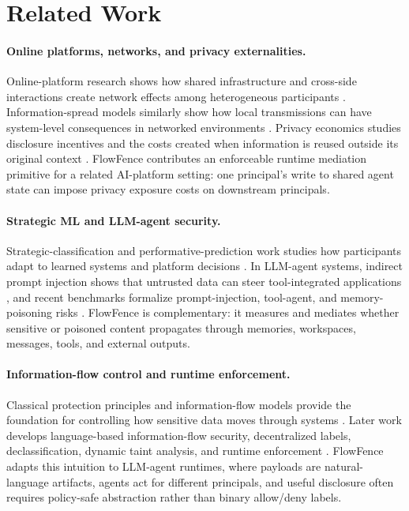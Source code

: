 \section{Related Work}

\paragraph{Online platforms, networks, and privacy externalities.}
Online-platform research shows how shared infrastructure and cross-side interactions create network effects among heterogeneous participants \cite{rochet2003platform,armstrong2006competition,katz1985network}. Information-spread models similarly show how local transmissions can have system-level consequences in networked environments \cite{kempe2003maximizing}. Privacy economics studies disclosure incentives and the costs created when information is reused outside its original context \cite{acquisti2016economics}. FlowFence contributes an enforceable runtime mediation primitive for a related AI-platform setting: one principal's write to shared agent state can impose privacy exposure costs on downstream principals.

\paragraph{Strategic ML and LLM-agent security.}
Strategic-classification and performative-prediction work studies how participants adapt to learned systems and platform decisions \cite{hardt2016strategic,perdomo2020performative}. In LLM-agent systems, indirect prompt injection shows that untrusted data can steer tool-integrated applications \cite{greshake2023indirect}, and recent benchmarks formalize prompt-injection, tool-agent, and memory-poisoning risks \cite{liu2023promptinjection,debenedetti2024agentdojo,chen2024agentpoison,zhang2025asb}. FlowFence is complementary: it measures and mediates whether sensitive or poisoned content propagates through memories, workspaces, messages, tools, and external outputs.

\paragraph{Information-flow control and runtime enforcement.}
Classical protection principles and information-flow models provide the foundation for controlling how sensitive data moves through systems \cite{saltzer1975protection,denning1976lattice}. Later work develops language-based information-flow security, decentralized labels, declassification, dynamic taint analysis, and runtime enforcement \cite{myers1999jflow,sabelfeld2003language,zdancewic2002robust,newsome2005dynamic,schneider2000enforceable}. FlowFence adapts this intuition to LLM-agent runtimes, where payloads are natural-language artifacts, agents act for different principals, and useful disclosure often requires policy-safe abstraction rather than binary allow/deny labels.

